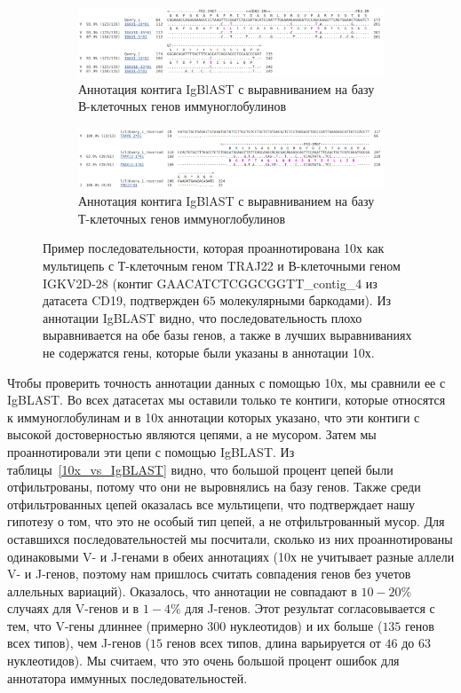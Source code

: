 \documentclass{spbau-diploma}
\begin{document}
\begin{figure}[h!]
  \centering
  \begin{subfigure}{\linewidth}
    \centering
    \includegraphics[width=1\textwidth]{figures/IgBLAST_bcr.png}
    \caption{Аннотация контига IgBlAST с выравниванием на базу В-клеточных генов иммуноглобулинов}
  \end{subfigure}

  \begin{subfigure}{\linewidth}
    \centering
    \includegraphics[width=1\textwidth]{figures/IgBLAST_tcr.png}
    \caption{Аннотация контига IgBlAST с выравниванием на базу Т-клеточных генов иммуноглобулинов}
  \end{subfigure}  
  \caption{Пример последовательности, которая проаннотирована 10х как мультицепь с Т-клеточным геном TRAJ22 и В-клеточными геном IGKV2D-28 (контиг GAACATCTCGGCGGTT\_contig\_4 из датасета CD19, подтвержден $65$ молекулярными баркодами).
  Из аннотации IgBLAST видно, что последовательность плохо выравнивается на обе базы генов, а также в лучших выравниваниях не содержатся гены, которые были указаны в аннотации 10х.}

  \label{IgBLAST_multi}
\end{figure}  


Чтобы проверить точность аннотации данных с помощью 10х, мы сравнили ее с IgBLAST.
Во всех датасетах мы оставили только те контиги, которые относятся к иммуноглобулинам и в 10х аннотации которых указано, что эти контиги с высокой достоверностью являются цепями, а не мусором. 
Затем мы проаннотировали эти цепи с помощью IgBLAST. 
Из таблицы~\ref{10x_vs_IgBLAST} видно, что большой процент цепей были отфильтрованы, потому что они не выровнялись на базу генов.
Также среди отфильтрованных цепей оказалась все мультицепи, что подтверждает нашу гипотезу о том, что это не особый тип цепей, а не отфильтрованный мусор. 
Для оставшихся последовательностей мы посчитали, сколько из них проаннотированы одинаковыми V- и J-генами в обеих аннотациях (10х не учитывает разные аллели V- и J-генов, поэтому нам пришлось считать совпадения генов без учетов аллельных вариаций). 
Оказалось, что аннотации не совпадают в $10-20\%$ случаях для V-генов и в $1-4\%$ для J-генов. 
Этот результат согласовывается с тем, что V-гены длиннее (примерно $300$ нуклеотидов)  и их больше ($135$ генов всех типов), чем J-генов ($15$ генов всех типов, длина варьируется от $46$ до $63$ нуклеотидов).
Мы считаем, что это очень большой процент ошибок для аннотатора иммунных последовательностей.
\end{document}
